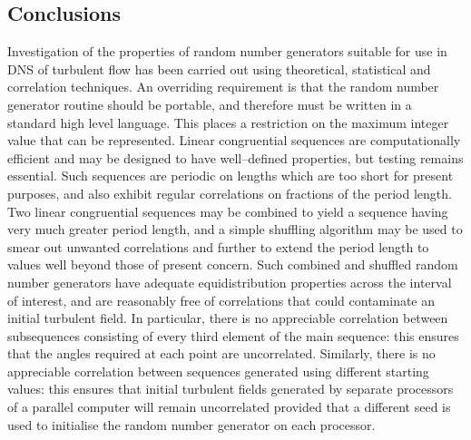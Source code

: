 \documentclass[dvips]{article}
\begin{document}
\subsection*{Conclusions}
Investigation of the properties of random number generators suitable for
use in DNS of turbulent flow has been carried out using theoretical,
statistical and correlation techniques.  An overriding requirement is
that the random number generator routine should be portable, and
therefore must be written in a standard high level language.  This
places a restriction on the maximum integer value that can be
represented.  Linear
congruential sequences are computationally efficient and may be designed
to have well--defined properties, but testing remains essential.  Such
sequences are periodic on lengths which are too short for present
purposes, and also exhibit regular correlations on fractions of the period
length.  Two linear congruential sequences may be combined to yield a
sequence having very much greater period length, and a simple shuffling
algorithm may be used to smear out unwanted correlations and further to
extend the period length to values well beyond those of present concern.
Such combined and shuffled random number generators have adequate
equidistribution properties across the interval of interest, and are
reasonably free of correlations that could contaminate an initial
turbulent field.  In particular, there is no appreciable correlation
between subsequences consisting of every third element of the main
sequence: this ensures that the angles required at each point are
uncorrelated.  Similarly, there is no appreciable correlation between
sequences generated using different starting values: this ensures that
initial turbulent fields generated by separate processors of a parallel
computer will remain uncorrelated provided that a different seed is used
to initialise the random number generator on each processor.
\end{document}
